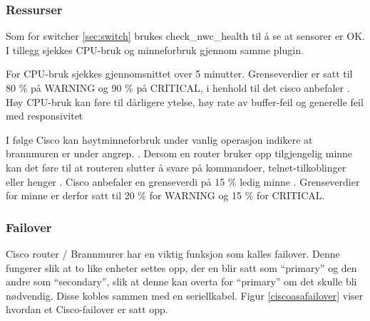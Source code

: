 \subsubsection{Ressurser}

Som for switcher \ref{sec:switch} brukes check\_nwc\_health til å se at sensorer er OK. I tillegg
sjekkes CPU-bruk og minneforbruk gjennom samme plugin. 

For CPU-bruk sjekkes gjennomsnittet over 5 minutter. Grenseverdier er satt til 80 \% på WARNING og 90 \% på CRITICAL, i henhold til det cisco anbefaler \cite{ciscounifiedcommunication}. Høy CPU-bruk kan føre til dårligere ytelse, høy rate av buffer-feil og generelle feil med responsivitet \cite{ciscocpurouters}

I følge Cisco kan høytminneforbruk under vanlig operasjon indikere at brannmuren er under angrep. \cite{ciscomem}. Dersom en router bruker opp tilgjengelig minne kan det føre til at routeren slutter å svare på kommandoer, telnet-tilkoblinger eller henger \cite{ciscomemproblem} . Cisco anbefaler en grenseverdi på 15 \% ledig minne \cite{ciscounifiedcommunication}. Grenseverdier for minne er derfor satt til 20 \% for WARNING og 15 \% for CRITICAL.

\subsubsection{Failover}

Cisco router / Brannmurer har en viktig funksjon som kalles failover. Denne fungerer slik at to like enheter settes opp, der en blir satt som “primary” og den andre som “secondary”, slik at denne kan overta for “primary” om det skulle bli nødvendig. Disse kobles sammen med en seriellkabel. Figur \ref{ciscoasafailover} viser hvordan et Cisco-failover er satt opp. 

